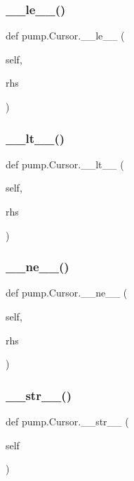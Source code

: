 \subsubsection{\texorpdfstring{\_\_le\_\_()}{\_\_le\_\_()}}
{\footnotesize\ttfamily def pump.\+Cursor.\+\_\+\+\_\+le\+\_\+\+\_\+ (\begin{DoxyParamCaption}\item[{}]{self,  }\item[{}]{rhs }\end{DoxyParamCaption})}

\mbox{\label{classpump_1_1_cursor_a4f846e3cf80aa45853b1fb7a03863745}} 
\subsubsection{\texorpdfstring{\_\_lt\_\_()}{\_\_lt\_\_()}}
{\footnotesize\ttfamily def pump.\+Cursor.\+\_\+\+\_\+lt\+\_\+\+\_\+ (\begin{DoxyParamCaption}\item[{}]{self,  }\item[{}]{rhs }\end{DoxyParamCaption})}

\mbox{\label{classpump_1_1_cursor_a7bcfe24fa4e5df6ed12f627b8d3b3ba3}} 
\subsubsection{\texorpdfstring{\_\_ne\_\_()}{\_\_ne\_\_()}}
{\footnotesize\ttfamily def pump.\+Cursor.\+\_\+\+\_\+ne\+\_\+\+\_\+ (\begin{DoxyParamCaption}\item[{}]{self,  }\item[{}]{rhs }\end{DoxyParamCaption})}

\mbox{\label{classpump_1_1_cursor_ada8d922763be27a0b1745e94748de2c3}} 
\subsubsection{\texorpdfstring{\_\_str\_\_()}{\_\_str\_\_()}}
{\footnotesize\ttfamily def pump.\+Cursor.\+\_\+\+\_\+str\+\_\+\+\_\+ (\begin{DoxyParamCaption}\item[{}]{self }\end{DoxyParamCaption})}

